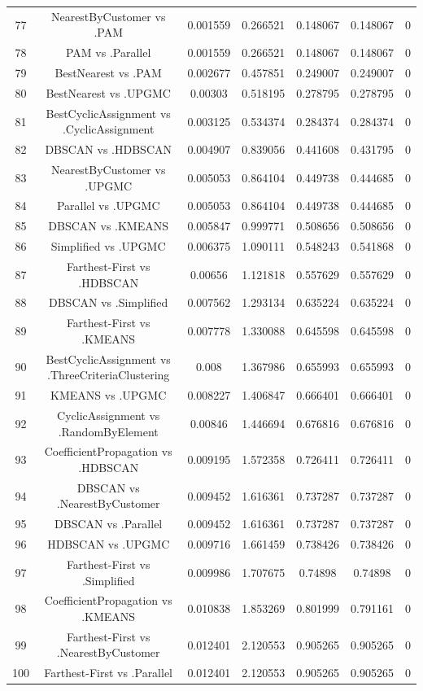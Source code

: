 \documentclass[a4paper,10pt]{article}
\begin{document}
\begin{landscape}
\begin{table}[!htp]
\begin{tabular}{ccccccc}
77&NearestByCustomer vs .PAM&0.001559&0.266521&0.148067&0.148067&0\\
78&PAM vs .Parallel&0.001559&0.266521&0.148067&0.148067&0\\
79&BestNearest vs .PAM&0.002677&0.457851&0.249007&0.249007&0\\
80&BestNearest vs .UPGMC&0.00303&0.518195&0.278795&0.278795&0\\
81&BestCyclicAssignment vs .CyclicAssignment&0.003125&0.534374&0.284374&0.284374&0\\
82&DBSCAN vs .HDBSCAN&0.004907&0.839056&0.441608&0.431795&0\\
83&NearestByCustomer vs .UPGMC&0.005053&0.864104&0.449738&0.444685&0\\
84&Parallel vs .UPGMC&0.005053&0.864104&0.449738&0.444685&0\\
85&DBSCAN vs .KMEANS&0.005847&0.999771&0.508656&0.508656&0\\
86&Simplified vs .UPGMC&0.006375&1.090111&0.548243&0.541868&0\\
87&Farthest-First vs .HDBSCAN&0.00656&1.121818&0.557629&0.557629&0\\
88&DBSCAN vs .Simplified&0.007562&1.293134&0.635224&0.635224&0\\
89&Farthest-First vs .KMEANS&0.007778&1.330088&0.645598&0.645598&0\\
90&BestCyclicAssignment vs .ThreeCriteriaClustering&0.008&1.367986&0.655993&0.655993&0\\
91&KMEANS vs .UPGMC&0.008227&1.406847&0.666401&0.666401&0\\
92&CyclicAssignment vs .RandomByElement&0.00846&1.446694&0.676816&0.676816&0\\
93&CoefficientPropagation vs .HDBSCAN&0.009195&1.572358&0.726411&0.726411&0\\
94&DBSCAN vs .NearestByCustomer&0.009452&1.616361&0.737287&0.737287&0\\
95&DBSCAN vs .Parallel&0.009452&1.616361&0.737287&0.737287&0\\
96&HDBSCAN vs .UPGMC&0.009716&1.661459&0.738426&0.738426&0\\
97&Farthest-First vs .Simplified&0.009986&1.707675&0.74898&0.74898&0\\
98&CoefficientPropagation vs .KMEANS&0.010838&1.853269&0.801999&0.791161&0\\
99&Farthest-First vs .NearestByCustomer&0.012401&2.120553&0.905265&0.905265&0\\
100&Farthest-First vs .Parallel&0.012401&2.120553&0.905265&0.905265&0\\

\end{tabular}
\end{table}
\end{landscape}
\end{document}
